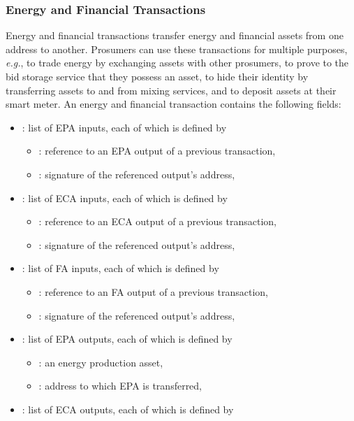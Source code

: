\subsubsection{Energy and Financial Transactions}
Energy and financial transactions transfer energy and financial assets
from one address to another.  Prosumers can use these transactions for
multiple purposes, {\em e.g.}, to trade energy by exchanging assets
with other prosumers, to prove to the bid storage service that they
possess an asset, to hide their identity by transferring assets to and
from mixing services, and to deposit assets at their smart meter.
%
An energy and financial transaction contains the following fields:
\begin{itemize}[noitemsep,topsep=-\parskip]
\item {}: list of EPA inputs, each of which is defined by
\begin{itemize}[leftmargin=0.5em,nosep]
\item {}: reference to an EPA output of a previous transaction,
\item {}: signature of the referenced output's address,
\end{itemize}
\item {}: list of ECA inputs, each of which is defined by
\begin{itemize}[leftmargin=0.5em,nosep]
\item {}: reference to an ECA output of a previous transaction,
\item {}: signature of the referenced output's address,
\end{itemize}
\item {}: list of FA inputs, each of which is defined by
\begin{itemize}[leftmargin=0.5em,nosep]
\item {}: reference to an FA output of a previous transaction,
\item {}: signature of the referenced output's address,
\end{itemize}
\item {}: list of EPA outputs, each of which is defined by
\begin{itemize}[leftmargin=0.5em,nosep]
\item {}: an energy production asset,
\item {}: address to which EPA is transferred,
\end{itemize}
\item {}: list of ECA outputs, each of which is defined by

\end{itemize}

